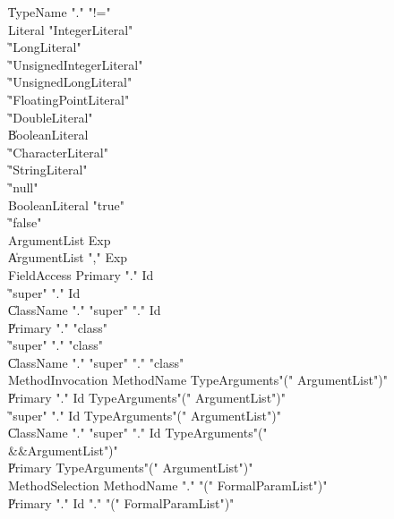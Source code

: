 \begin{grammar}

    \|   TypeName  \xcd"."  \xcd"!="\\
 Literal  \:   \xcd"IntegerLiteral"  \\
    \|   \xcd"LongLiteral"  \\
    \|   \xcd"UnsignedIntegerLiteral"  \\
    \|   \xcd"UnsignedLongLiteral"  \\
    \|   \xcd"FloatingPointLiteral"  \\
    \|   \xcd"DoubleLiteral"  \\
    \|   BooleanLiteral\\
    \|   \xcd"CharacterLiteral"  \\
    \|   \xcd"StringLiteral"  \\
    \|   \xcd"null"\\
 BooleanLiteral  \:   \xcd"true"  \\
    \|   \xcd"false"  \\
 ArgumentList  \:   Exp\\
    \|   ArgumentList  \xcd","  Exp\\
 FieldAccess  \:   Primary  \xcd"."  Id\\
    \|   \xcd"super"  \xcd"."  Id\\
    \|   ClassName  \xcd"."  \xcd"super"    \xcd"."  Id\\
    \|   Primary  \xcd"."  \xcd"class"  \\
    \|   \xcd"super"  \xcd"."  \xcd"class"  \\
    \|   ClassName  \xcd"."  \xcd"super"    \xcd"."  \xcd"class"  \\
 MethodInvocation  \:   MethodName  TypeArguments\opt  \xcd"("  ArgumentList\opt  \xcd")"\\
    \|   Primary  \xcd"."  Id  TypeArguments\opt  \xcd"("  ArgumentList\opt  \xcd")"\\
    \|   \xcd"super"  \xcd"."  Id  TypeArguments\opt  \xcd"("  ArgumentList\opt  \xcd")"\\
    \|   ClassName  \xcd"."  \xcd"super"    \xcd"."  Id  TypeArguments\opt  \xcd"("\\
          &&ArgumentList\opt  \xcd")"\\
    \|   Primary  TypeArguments\opt  \xcd"("  ArgumentList\opt  \xcd")"\\
 MethodSelection  \:   MethodName  \xcd"."  \xcd"("  FormalParamList\opt  \xcd")"\\
    \|   Primary  \xcd"."  Id  \xcd"."  \xcd"("  FormalParamList\opt  \xcd")"\\

\end{grammar}

